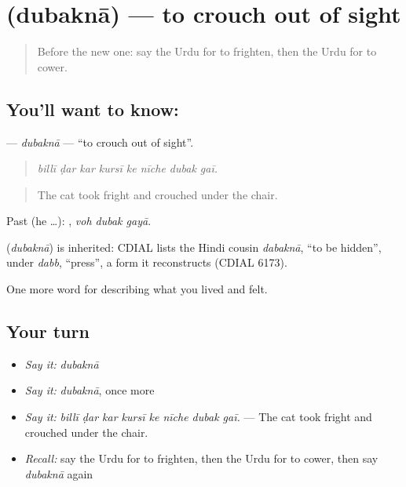 \section[\texorpdfstring{\ur{دبکنا} (dubaknā)}{دبکنا (dubaknā)}]{ (dubaknā) — to crouch out of sight}

\label{lesson:UR-C445-dubakna}



\begin{quote}
Before the new one: say the Urdu for to frighten, then the Urdu for to cower.
\end{quote}

\subsection*{You'll want to know: }
\textbf{} — \emph{dubaknā} — \textquotedblleft{}to crouch out of sight\textquotedblright{}.

\begin{quote}
       
\end{quote}

\begin{quote}
\emph{billī ḍar kar kursī ke nīche dubak gaī.}
\end{quote}

\begin{quote}
The cat took fright and crouched under the chair.
\end{quote}

Past (he …):   , \emph{voh dubak gayā}.

\begin{cousinweb}
\textbf{} (\emph{dubaknā}) is inherited: CDIAL lists the Hindi cousin \emph{dabaknā}, \textquotedblleft{}to be hidden\textquotedblright{}, under \emph{dabb}, \textquotedblleft{}press\textquotedblright{}, a form it reconstructs (CDIAL 6173).
\end{cousinweb}

\begin{grammarlens}[title={What you've built}]
One more word for describing what you lived and felt.
\end{grammarlens}

\subsection*{Your turn}
\begin{itemize}
\raggedright
  \item \emph{Say it:} \emph{dubaknā}
  \item \emph{Say it:} \emph{dubaknā}, once more
  \item \emph{Say it:} \emph{billī ḍar kar kursī ke nīche dubak gaī.} — The cat took fright and crouched under the chair.
  \item \emph{Recall:} say the Urdu for to frighten, then the Urdu for to cower, then say \emph{dubaknā} again
\end{itemize}


